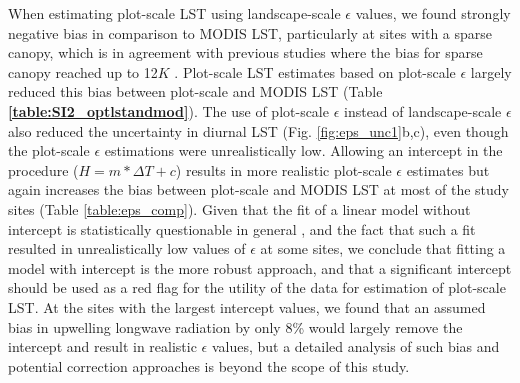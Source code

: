 \documentclass[fleqn,10pt]{wlscirep}
\begin{document}
{{%
When estimating plot-scale LST using landscape-scale $\epsilon$ values, we found strongly negative bias in comparison to MODIS LST, particularly at sites with a sparse canopy, which is in agreement with previous studies where the bias for sparse canopy reached up to 12$K$ \cite{guillevic2018land}. Plot-scale LST estimates based on plot-scale $\epsilon$ largely reduced this bias between plot-scale and MODIS LST (Table \textbf{\ref{table:SI2_optlstandmod}}). The use of plot-scale $\epsilon$ instead of landscape-scale $\epsilon$ also reduced the uncertainty in diurnal LST (Fig. \ref{fig:eps_unc1}b,c), even though the plot-scale $\epsilon$ estimations were unrealistically low. Allowing an intercept in the procedure ($H=m*\Delta T + c$)  results in more realistic plot-scale $\epsilon$ estimates but again increases the bias between plot-scale and MODIS LST at most of the study sites (Table \ref{table:eps_comp}). Given that the fit of a linear model without intercept is statistically questionable in general \cite{eisenhauer2003regression}, and the fact that such a fit resulted in unrealistically low values of $\epsilon$ at some sites, we conclude that fitting a model with intercept is the more robust approach, and that a significant intercept should be used as a red flag for the utility of the data for estimation of plot-scale LST. At the sites with the largest intercept values, we found that an assumed bias in upwelling longwave radiation by only 8\% would largely remove the intercept and result in realistic $\epsilon$ values, but a detailed analysis of such bias and potential correction approaches is beyond the scope of this study.

}}
\end{document}

